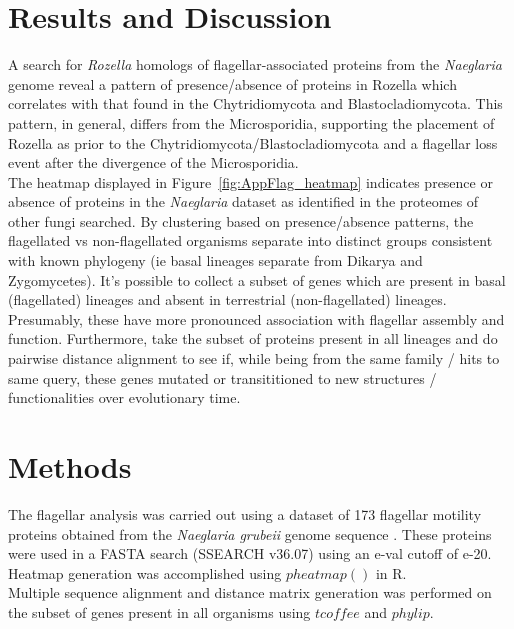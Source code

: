 \section{Results and Discussion}
A search for \textit{Rozella} homologs of flagellar-associated proteins from the \textit{Naeglaria} genome \cite{FritzLaylin2011} reveal a pattern of presence/absence of proteins in Rozella which correlates with that found in the Chytridiomycota and Blastocladiomycota. This pattern, in general, differs from the Microsporidia, supporting the placement of Rozella as prior to the Chytridiomycota/Blastocladiomycota and a flagellar loss event after the divergence of the Microsporidia. \\
\indent The heatmap displayed in Figure~\ref{fig:AppFlag_heatmap} indicates presence or absence of proteins in the \textit{Naeglaria} dataset as identified in the proteomes of other fungi searched. By clustering based on presence/absence patterns, the flagellated vs non-flagellated organisms separate into distinct groups consistent with known phylogeny (ie basal lineages separate from Dikarya and Zygomycetes). It's possible to collect a subset of genes which are present in basal (flagellated) lineages and absent in terrestrial (non-flagellated) lineages. Presumably, these have more pronounced association with flagellar assembly and function. Furthermore, take the subset of proteins present in all lineages and do pairwise distance alignment to see if, while being from the same family / hits to same query, these genes mutated or transititioned to new structures / functionalities over evolutionary time.\\
\section{Methods}
The flagellar analysis was carried out using a dataset of 173 flagellar motility proteins obtained from the \textit{Naeglaria grubeii} genome sequence \cite{FritzLaylin2011}. These proteins were used in a FASTA search (SSEARCH v36.07) using an e-val cutoff of e-20. Heatmap generation was accomplished using $pheatmap()$ in R.\\
\indent Multiple sequence alignment and distance matrix generation was performed on the subset of genes present in all organisms using $tcoffee$ and $phylip$.\\
